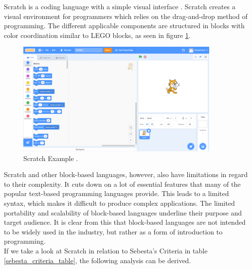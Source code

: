 Scratch is a coding language with a simple visual interface \cite{scratchabout}. Scratch creates a visual environment for programmers which relies on the drag-and-drop method of programming. The different applicable components are structured in blocks with color coordination similar to LEGO blocks, as seen in figure \ref{fig:scratchexample}.\\

\begin{figure}[H] 
    \begin{center}
        \includegraphics[width=0.9\textwidth]{Files/Billeder: Analyse/Scratch_3.0_Program.png}
    \end{center}
    \caption{Scratch Example \cite{ScratchEksempelBillede}.}
    \label{fig:scratchexample}
\end{figure}


Scratch and other block-based languages, however, also have limitations in regard to their complexity. It cuts down on a lot of essential features that many of the popular text-based programming languages provide. This leads to a limited syntax, which makes it difficult to produce complex applications. The limited portability and scalability of block-based languages underline their purpose and target audience. It is clear from this that block-based languages are not intended to be widely used in the industry, but rather as a form of introduction to programming. \\

\noindent
If we take a look at Scratch in relation to Sebesta's Criteria in table \ref{sebesta_criteria_table}, the following analysis can be derived.\\


